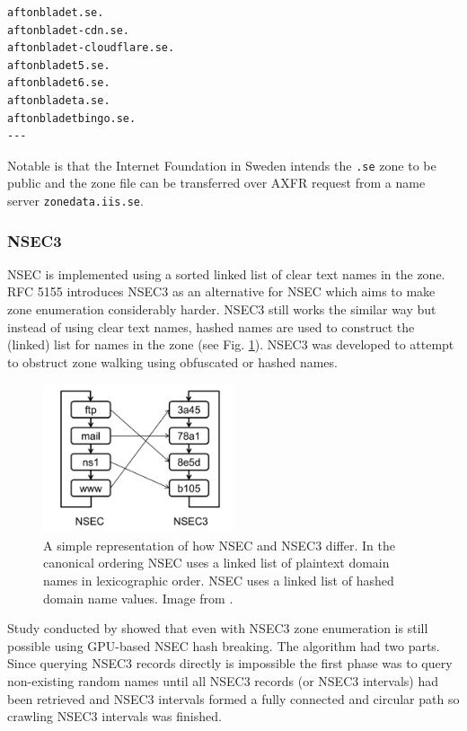 \begin{verbatim}
aftonbladet.se.
aftonbladet-cdn.se.
aftonbladet-cloudflare.se.
aftonbladet5.se.
aftonbladet6.se.
aftonbladeta.se.
aftonbladetbingo.se.
---
\end{verbatim}

Notable is that the Internet Foundation in Sweden \cite{sweden} intends the \texttt{.se} zone to be public and the zone file can be transferred over AXFR request from a name server \texttt{zonedata.iis.se}.

\subsubsection{NSEC3}
\label{sec:nsec3}
NSEC is implemented using a sorted linked list of clear text names in the zone.
RFC 5155 \cite{RFC5155} introduces NSEC3 as an alternative for NSEC which aims to make zone enumeration considerably harder. NSEC3 still works the similar way but instead of using clear text names, hashed names are used to construct the (linked) list for names in the zone (see Fig. \ref{fig:hash_list}). NSEC3 was developed to attempt to obstruct zone walking using obfuscated or hashed names.

\begin{figure}[htb]
  \begin{center}
    \includegraphics[width=0.5\textwidth]{nsec3.png}
    \caption{A simple representation of how NSEC and NSEC3 differ. In the canonical ordering NSEC uses a linked list of plaintext domain names in lexicographic order. NSEC uses a linked list of hashed domain name values. Image from \cite{NSEC3_hash_breaking}.} 
    \label{fig:hash_list}
  \end{center}
\end{figure}

Study conducted by \citet{NSEC3_hash_breaking} showed that even with NSEC3 zone enumeration is still possible using GPU-based NSEC hash breaking. The algorithm had two parts. Since querying NSEC3 records directly is impossible the first phase was to query non-existing random names until all NSEC3 records (or NSEC3 intervals) had been retrieved and NSEC3 intervals formed a fully connected and circular path so crawling NSEC3 intervals was finished.



